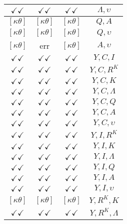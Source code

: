 \documentclass[a4paper,10pt]{article}
\begin{document}
\begin{longtable}{|c|c|c|c|}
\hline
$\checkmark\checkmark$ & $\checkmark\checkmark$ & $\checkmark\checkmark$ & ${\Lambda},{\upsilon}$ \\
\hline
$[\kappa \theta ]$ & $[\kappa \theta ]$ & $[\kappa \theta ]$ & ${Q},{A}$ \\
\hline
$[\kappa \theta ]$ & $[\kappa \theta ]$ & $[\kappa \theta ]$ & ${Q},{\upsilon}$ \\
\hline
$[\kappa \theta ]$ & err & $[\kappa \theta ]$ & ${A},{\upsilon}$ \\
\hline
$\checkmark\checkmark$ & $\checkmark\checkmark$ & $\checkmark\checkmark$ & ${Y},{C},{I}$ \\
\hline
$\checkmark\checkmark$ & $\checkmark\checkmark$ & $\checkmark\checkmark$ & ${Y},{C},{R^{K}}$ \\
\hline
$\checkmark\checkmark$ & $\checkmark\checkmark$ & $\checkmark\checkmark$ & ${Y},{C},{K}$ \\
\hline
$\checkmark\checkmark$ & $\checkmark\checkmark$ & $\checkmark\checkmark$ & ${Y},{C},{\Lambda}$ \\
\hline
$\checkmark\checkmark$ & $\checkmark\checkmark$ & $\checkmark\checkmark$ & ${Y},{C},{Q}$ \\
\hline
$\checkmark\checkmark$ & $\checkmark\checkmark$ & $\checkmark\checkmark$ & ${Y},{C},{A}$ \\
\hline
$\checkmark\checkmark$ & $\checkmark\checkmark$ & $\checkmark\checkmark$ & ${Y},{C},{\upsilon}$ \\
\hline
$\checkmark\checkmark$ & $\checkmark\checkmark$ & $\checkmark\checkmark$ & ${Y},{I},{R^{K}}$ \\
\hline
$\checkmark\checkmark$ & $\checkmark\checkmark$ & $\checkmark\checkmark$ & ${Y},{I},{K}$ \\
\hline
$\checkmark\checkmark$ & $\checkmark\checkmark$ & $\checkmark\checkmark$ & ${Y},{I},{\Lambda}$ \\
\hline
$\checkmark\checkmark$ & $\checkmark\checkmark$ & $\checkmark\checkmark$ & ${Y},{I},{Q}$ \\
\hline
$\checkmark\checkmark$ & $\checkmark\checkmark$ & $\checkmark\checkmark$ & ${Y},{I},{A}$ \\
\hline
$\checkmark\checkmark$ & $\checkmark\checkmark$ & $\checkmark\checkmark$ & ${Y},{I},{\upsilon}$ \\
\hline
$[\kappa \theta ]$ & $[\kappa \theta ]$ & $[\kappa \theta ]$ & ${Y},{R^{K}},{K}$ \\
\hline
$\checkmark\checkmark$ & $\checkmark\checkmark$ & $\checkmark\checkmark$ & ${Y},{R^{K}},{\Lambda}$ \\

\end{longtable}
\end{document}
